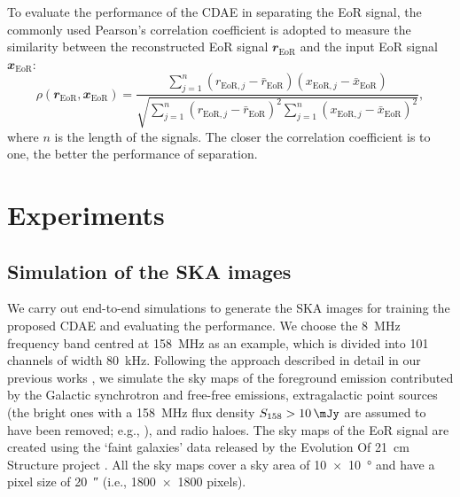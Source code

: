 \documentclass[letters,fleqn,usenatbib,onecolumn]{mnras}
\newcommand{\R}[1]{\mathrm{#1}}
\newcommand{\B}[1]{\mathbfit{#1}}
\begin{document}
To evaluate the performance of the CDAE in separating the EoR signal,
the commonly used Pearson's correlation coefficient
\citep[e.g.,][]{harker2009,chapman2013}
is adopted to measure the similarity between the reconstructed EoR
signal $\B{r}_{\R{EoR}}$ and the input EoR signal $\B{x}_{\R{EoR}}$:
\begin{equation}
  \label{eq:corrcoef}
  \rho(\B{r}_{\R{EoR}}, \B{x}_{\R{EoR}}) =
    \frac{\sum_{j=1}^{n}(r_{\R{EoR},j} - \bar{r}_{\R{EoR}})
      (x_{\R{EoR},j} - \bar{x}_{\R{EoR}})}{
        \sqrt{\sum_{j=1}^{n}(r_{\R{EoR},j} - \bar{r}_{\R{EoR}})^2
          \sum_{j=1}^{n}(x_{\R{EoR},j} - \bar{x}_{\R{EoR}})^2}
    },
\end{equation}
where $n$ is the length of the signals.
The closer the correlation coefficient is to one, the better the
performance of separation.


\section{Experiments}
\label{sec:experiments}

\subsection{Simulation of the SKA images}
\label{sec:simulation}

We carry out end-to-end simulations to generate the SKA images for
training the proposed CDAE and evaluating the performance.
We choose the \SI{8}{\MHz} frequency band centred at \SI{158}{\MHz} as
an example, which is divided into 101 channels of width \SI{80}{\kHz}.
Following the approach described in detail in our previous works
\citep{wang2010,wang2013}, we simulate the sky maps of the foreground
emission contributed by the Galactic synchrotron and free-free
emissions, extragalactic point sources (the bright ones with a
\SI{158}{\MHz} flux density $S_{158} > \SI{10}{\mJy}$ are assumed to
have been removed; e.g., \citealt{liu2009ps}), and radio haloes.
The sky maps of the EoR signal are created using the `faint galaxies'
data released by the Evolution Of 21~cm Structure project
\citep{mesinger2016}.
All the sky maps cover a sky area of \SI{10 x 10}{\degree} and have
a pixel size of \SI{20}{\arcsecond} (i.e., \num{1800 x 1800} pixels).
\end{document}
